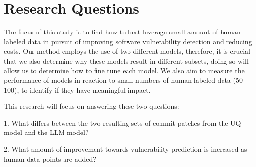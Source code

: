 \section{Research Questions}
\done{}

The focus of this study is to find how to best leverage small amount of human labeled data in pursuit of improving software vulnerability detection and reducing costs. Our method employs the use of two different models, therefore, it is crucial that we also determine why these models result in different subsets, doing so will allow us to determine how to fine tune each model. We also aim to measure the performance of models in reaction to small numbers of human labeled data (50-100), to identify if they have meaningful impact. 

This research will focus on answering these two questions:

    1. What differs between the two resulting sets of commit patches from the UQ model and the LLM model?


    2. What amount of improvement towards vulnerability prediction is increased as human data points are added?
